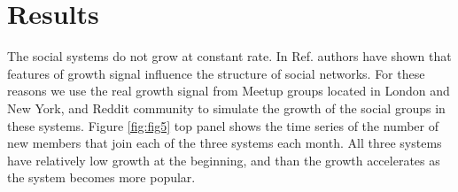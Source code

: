 


\section{Results}

The social systems do not grow at constant rate. In Ref. \cite{vranic2021growth} authors have shown that features of growth signal influence the  structure of social networks. For these reasons we use the real growth signal from Meetup groups located in London and New York, and Reddit community to simulate the growth of the social groups in these systems. Figure \ref{fig:fig5} top panel shows the time series of the number of new members that join each of the three systems each month. All three systems have relatively low growth at the beginning, and than the growth accelerates as the system becomes more popular.

